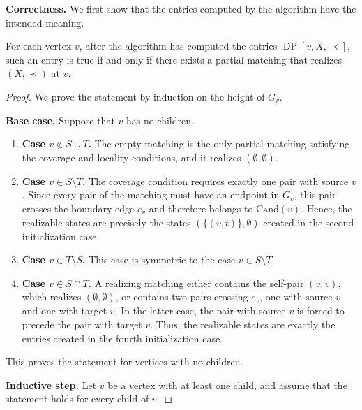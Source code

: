 \documentclass[a4paper,USenglish,thm-restate]{lipics-v2021}
\newcommand{\cand}{\mathrm{Cand}}
\theoremstyle{problemstyle}
\begin{document}
\smallskip
\noindent\textbf{Correctness.}
We first show that the entries computed by the algorithm have the intended meaning.

\begin{lemma}\label{lem:tree-candidate-multiplicity-table-correctness}
For each vertex $v$, after the algorithm has computed the entries $\operatorname{DP}[v,X,\prec]$, such an entry is true if and only if there exists a partial matching that realizes $(X,\prec)$ at $v$.
\end{lemma}
 
\begin{proof}
We prove the statement by induction on the height of $G_v$.
 
\smallskip
\noindent\textbf{Base case.}
Suppose that $v$ has no children.
 
\begin{enumerate}
\item \textbf{Case $v\notin S\cup T$.}
The empty matching is the only partial matching satisfying the coverage and locality conditions, and it realizes $(\emptyset,\emptyset)$.
 
\item \textbf{Case $v\in S\setminus T$.}
The coverage condition requires exactly one pair with source $v$. Since every pair of the matching must have an endpoint in $G_v$, this pair crosses the boundary edge $e_v$ and therefore belongs to $\cand(v)$. Hence, the realizable states are precisely the states $(\{(v,t)\},\emptyset)$ created in the second initialization case.
 
\item \textbf{Case $v\in T\setminus S$.}
This case is symmetric to the case $v\in S\setminus T$.
 
\item \textbf{Case $v\in S\cap T$.}
A realizing matching either contains the self-pair $(v,v)$, which realizes $(\emptyset,\emptyset)$, or contains two pairs crossing $e_v$, one with source $v$ and one with target $v$. In the latter case, the pair with source $v$ is forced to precede the pair with target $v$. Thus, the realizable states are exactly the entries created in the fourth initialization case.
\end{enumerate}
 
This proves the statement for vertices with no children.
 
\smallskip
\noindent\textbf{Inductive step.}
Let $v$ be a vertex with at least one child, and assume that the statement holds for every child of $v$.
 

\end{proof}
\end{document}
